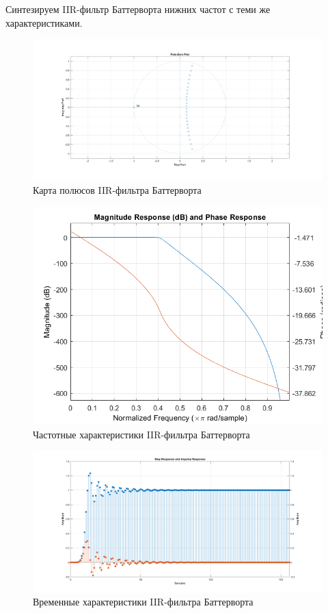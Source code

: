 \documentclass[12pt,a4paper]{article}
\begin{document}
	Синтезируем IIR-фильтр Баттерворта нижних частот с теми же характеристиками.
	
	\begin{figure}[H]
		\centering
		\includegraphics[width=1.0\linewidth]{res/5_batt_poles.png}
		\caption{Карта полюсов IIR-фильтра Баттерворта}
	\end{figure}
	
	\begin{figure}[H]
		\centering
		\includegraphics[width=1.0\linewidth]{res/5_batt_ach.png}
		\caption{Частотные характеристики IIR-фильтра Баттерворта}
	\end{figure}
	
	\begin{figure}[H]
		\centering
		\includegraphics[width=1.0\linewidth]{res/5_batt_time.png}
		\caption{Временные характеристики IIR-фильтра Баттерворта}
	\end{figure}
	
\end{document}
